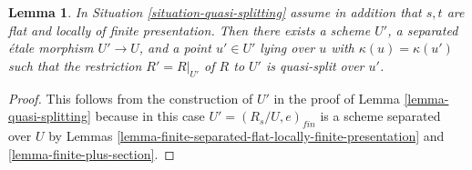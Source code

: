 \documentclass{stacks-project}
\theoremstyle{plain}
\newtheorem{lemma}[subsection]{Lemma}
\theoremstyle{definition}
\theoremstyle{remark}
\numberwithin{equation}{subsection}
\begin{document}
\begin{lemma}
\label{lemma-quasi-splitting-scheme}
In Situation \ref{situation-quasi-splitting} assume in addition that
$s, t$ are flat and locally of finite presentation.
Then there exists a scheme $U'$, a separated \'etale morphism
$U' \to U$, and a point $u' \in U'$ lying over $u$ with
$\kappa(u) = \kappa(u')$ such that the restriction $R' = R|_{U'}$ of
$R$ to $U'$ is quasi-split over $u'$.
\end{lemma}

\begin{proof}
This follows from the construction of $U'$ in the proof of
Lemma \ref{lemma-quasi-splitting}
because in this case $U' = (R_s/U, e)_{fin}$ is a scheme separated
over $U$ by
Lemmas \ref{lemma-finite-separated-flat-locally-finite-presentation} and
\ref{lemma-finite-plus-section}.
\end{proof}
\end{document}
